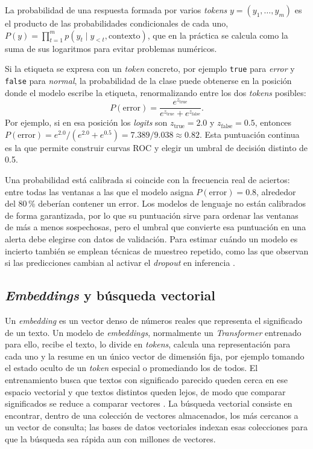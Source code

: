 La probabilidad de una respuesta formada por varios \textit{tokens} $y = (y_1, \ldots, y_m)$ es el producto de las probabilidades condicionales de cada uno, $P(y) = \prod_{t=1}^{m} p(y_t \mid y_{<t}, \text{contexto})$, que en la práctica se calcula como la suma de sus logaritmos para evitar problemas numéricos.

Si la etiqueta se expresa con un \textit{token} concreto, por ejemplo \texttt{true} para \emph{error} y \texttt{false} para \emph{normal}, la probabilidad de la clase puede obtenerse en la posición donde el modelo escribe la etiqueta, renormalizando entre los dos \textit{tokens} posibles:
\begin{equation}
P(\text{error}) = \frac{e^{z_{\text{true}}}}{e^{z_{\text{true}}} + e^{z_{\text{false}}}}.
\end{equation}
Por ejemplo, si en esa posición los \textit{logits} son $z_{\text{true}} = 2.0$ y $z_{\text{false}} = 0.5$, entonces $P(\text{error}) = e^{2.0}/(e^{2.0} + e^{0.5}) = 7.389/9.038 \approx 0.82$. Esta puntuación continua es la que permite construir curvas ROC y elegir un umbral de decisión distinto de 0.5.

Una probabilidad está calibrada si coincide con la frecuencia real de aciertos: entre todas las ventanas a las que el modelo asigna $P(\text{error}) = 0.8$, alrededor del 80\,\% deberían contener un error. Los modelos de lenguaje no están calibrados de forma garantizada, por lo que su puntuación sirve para ordenar las ventanas de más a menos sospechosas, pero el umbral que convierte esa puntuación en una alerta debe elegirse con datos de validación. Para estimar cuándo un modelo es incierto también se emplean técnicas de muestreo repetido, como las que observan si las predicciones cambian al activar el \textit{dropout} en inferencia \cite{ma2026_adaptivelog}.

\subsection{\textit{Embeddings} y búsqueda vectorial}\label{sec:mt_embeddings}

Un \textit{embedding} es un vector denso de números reales que representa el significado de un texto. Un modelo de \textit{embeddings}, normalmente un \textit{Transformer} entrenado para ello, recibe el texto, lo divide en \textit{tokens}, calcula una representación para cada uno y la resume en un único vector de dimensión fija, por ejemplo tomando el estado oculto de un \textit{token} especial o promediando los de todos. El entrenamiento busca que textos con significado parecido queden cerca en ese espacio vectorial y que textos distintos queden lejos, de modo que comparar significados se reduce a comparar vectores \cite{murphy2024_embeddings}. La búsqueda vectorial consiste en encontrar, dentro de una colección de vectores almacenados, los más cercanos a un vector de consulta; las bases de datos vectoriales indexan esas colecciones para que la búsqueda sea rápida aun con millones de vectores.


